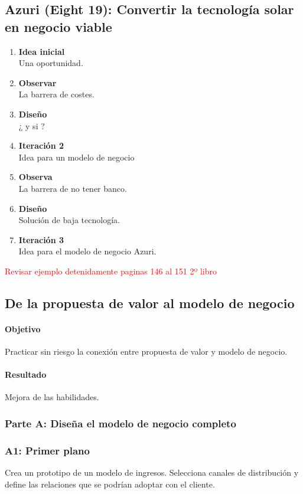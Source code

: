 \documentclass[11pt]{book}
\begin{document}
\subsection{Azuri (Eight 19): Convertir la tecnología solar en negocio viable}
\begin{enumerate}
\item \textbf{ Idea inicial }\\
Una oportunidad.
\item \textbf{ Observar }\\
La barrera de costes.
\item \textbf{ Diseño }\\
¿ y si ?
\item \textbf{ Iteración 2 }\\
Idea para un modelo de negocio
\item \textbf{ Observa }\\
La barrera de no tener banco.
\item \textbf{ Diseño }\\
Solución de baja tecnología.
\item \textbf{ Iteración 3 }\\
Idea para el modelo de negocio Azuri. 
\end{enumerate}
\textcolor{red}{Revisar ejemplo detenidamente paginas 146 al 151 2º libro}
\subsection{De la propuesta de valor al modelo de negocio}
\paragraph{Objetivo}
Practicar sin riesgo la conexión entre propuesta de valor y modelo de negocio.
\paragraph{Resultado}
Mejora de las habilidades.
\subsubsection{Parte A: Diseña el modelo de negocio completo}
\subsubsection{A1: Primer plano}
Crea un prototipo de un modelo de ingresos. Selecciona canales de distribución y define las relaciones que se podrían adoptar con el cliente.
\end{document}
